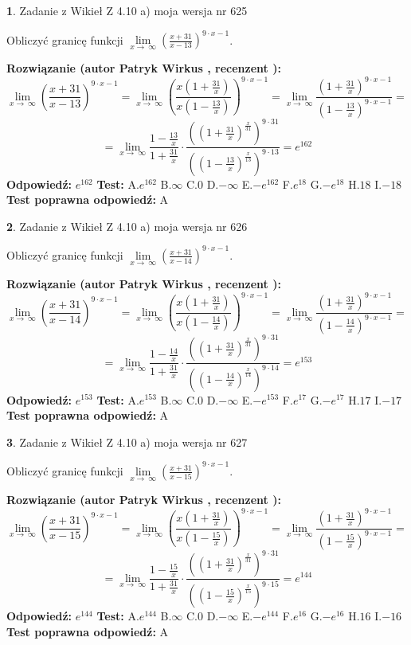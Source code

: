\documentclass[12pt, a4paper]{article}
\theoremstyle{definition} %
\newtheorem{zad}{}
\newcommand{\zadStart}[1]{\begin{zad}#1\newline}
\newcommand{\zadStop}{\end{zad}}
\newcommand{\rozwStart}[2]{\noindent \textbf{Rozwiązanie (autor #1 , recenzent #2): }\newline}
\newcommand{\rozwStop}{\newline}
\newcommand{\odpStart}{\noindent \textbf{Odpowiedź:}\newline}
\newcommand{\odpStop}{\newline}
\newcommand{\testStart}{\noindent \textbf{Test:}\newline}
\newcommand{\testStop}{\newline}
\newcommand{\kluczStart}{\noindent \textbf{Test poprawna odpowiedź:}\newline}
\newcommand{\kluczStop}{\newline}
\begin{document}
\zadStart{Zadanie z Wikieł Z 4.10 a) moja wersja nr 625}

Obliczyć granicę funkcji  $\lim\limits_{x\to\ \infty}(\frac{x+31}{x-13})^{9\cdot x-1}$.
\zadStop
\rozwStart{Patryk Wirkus}{}
$$\lim\limits_{x\to\ \infty}(\frac{x+31}{x-13})^{9\cdot x-1} = \lim\limits_{x\to\ \infty}(\frac{x(1+\frac{31}{x})}{x(1-\frac{13}{x})})^{9\cdot x-1}=\lim\limits_{x\to\ \infty}\frac{(1+\frac{31}{x})^{9\cdot x-1}}{(1-\frac{13}{x})^{9\cdot x-1}}=$$
$$=\lim\limits_{x\to\ \infty}\frac{1-\frac{13}{x}}{1+\frac{31}{x}}\cdot\frac{((1+\frac{31}{x})^{\frac{x}{31}})^{9\cdot31}}{((1-\frac{13}{x})^{\frac{x}{13}})^{9\cdot13}}=e^{162}$$
\rozwStop
\odpStart
$e^{162}$
\odpStop
\testStart
A.$e^{162}$ B.$\infty$ C.$0$ D.$-\infty$ E.$-e^{162}$
F.$e^{18}$ G.$-e^{18}$
H.$18$
I.$-18$
\testStop
\kluczStart
A
\kluczStop



\zadStart{Zadanie z Wikieł Z 4.10 a) moja wersja nr 626}

Obliczyć granicę funkcji  $\lim\limits_{x\to\ \infty}(\frac{x+31}{x-14})^{9\cdot x-1}$.
\zadStop
\rozwStart{Patryk Wirkus}{}
$$\lim\limits_{x\to\ \infty}(\frac{x+31}{x-14})^{9\cdot x-1} = \lim\limits_{x\to\ \infty}(\frac{x(1+\frac{31}{x})}{x(1-\frac{14}{x})})^{9\cdot x-1}=\lim\limits_{x\to\ \infty}\frac{(1+\frac{31}{x})^{9\cdot x-1}}{(1-\frac{14}{x})^{9\cdot x-1}}=$$
$$=\lim\limits_{x\to\ \infty}\frac{1-\frac{14}{x}}{1+\frac{31}{x}}\cdot\frac{((1+\frac{31}{x})^{\frac{x}{31}})^{9\cdot31}}{((1-\frac{14}{x})^{\frac{x}{14}})^{9\cdot14}}=e^{153}$$
\rozwStop
\odpStart
$e^{153}$
\odpStop
\testStart
A.$e^{153}$ B.$\infty$ C.$0$ D.$-\infty$ E.$-e^{153}$
F.$e^{17}$ G.$-e^{17}$
H.$17$
I.$-17$
\testStop
\kluczStart
A
\kluczStop



\zadStart{Zadanie z Wikieł Z 4.10 a) moja wersja nr 627}

Obliczyć granicę funkcji  $\lim\limits_{x\to\ \infty}(\frac{x+31}{x-15})^{9\cdot x-1}$.
\zadStop
\rozwStart{Patryk Wirkus}{}
$$\lim\limits_{x\to\ \infty}(\frac{x+31}{x-15})^{9\cdot x-1} = \lim\limits_{x\to\ \infty}(\frac{x(1+\frac{31}{x})}{x(1-\frac{15}{x})})^{9\cdot x-1}=\lim\limits_{x\to\ \infty}\frac{(1+\frac{31}{x})^{9\cdot x-1}}{(1-\frac{15}{x})^{9\cdot x-1}}=$$
$$=\lim\limits_{x\to\ \infty}\frac{1-\frac{15}{x}}{1+\frac{31}{x}}\cdot\frac{((1+\frac{31}{x})^{\frac{x}{31}})^{9\cdot31}}{((1-\frac{15}{x})^{\frac{x}{15}})^{9\cdot15}}=e^{144}$$
\rozwStop
\odpStart
$e^{144}$
\odpStop
\testStart
A.$e^{144}$ B.$\infty$ C.$0$ D.$-\infty$ E.$-e^{144}$
F.$e^{16}$ G.$-e^{16}$
H.$16$
I.$-16$
\testStop
\kluczStart
A
\kluczStop
\end{document}
